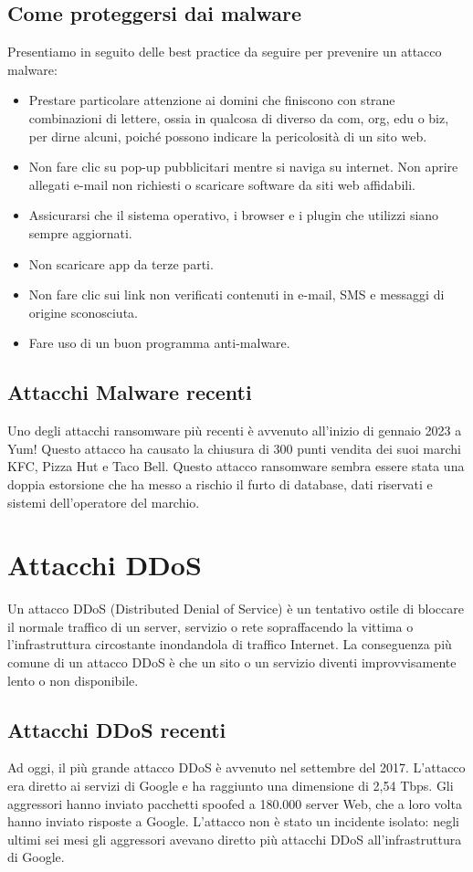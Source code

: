 \subsection{Come proteggersi dai malware}
Presentiamo in seguito delle best practice da seguire per prevenire un attacco malware:
\begin{itemize}
    \item Prestare particolare attenzione ai domini che finiscono con strane combinazioni di lettere, ossia in qualcosa di diverso da com, org, edu o biz, per dirne alcuni, poiché possono indicare la pericolosità di un sito web.
    \item Non fare clic su pop-up pubblicitari mentre si naviga su internet. Non aprire allegati e-mail non richiesti o scaricare software da siti web affidabili.
    \item Assicurarsi che il sistema operativo, i browser e i plugin che utilizzi siano sempre aggiornati.
    \item Non scaricare app da terze parti.
    \item Non fare clic sui link non verificati contenuti in e-mail, SMS e messaggi di origine sconosciuta.
    \item Fare uso di un buon programma anti-malware. 
\end{itemize}
\subsection{Attacchi Malware recenti}
Uno degli attacchi ransomware più recenti è avvenuto all'inizio di gennaio  2023 a Yum! Questo attacco ha causato la chiusura di 300 punti vendita dei suoi marchi KFC, Pizza Hut e Taco Bell.  
Questo attacco ransomware sembra essere stata una doppia estorsione che ha messo a rischio il furto di database, dati riservati e sistemi dell'operatore del marchio.
\cite{Malware}
\section{Attacchi DDoS}
Un attacco DDoS (Distributed Denial of Service) è un tentativo ostile di bloccare il normale traffico di un server, servizio o rete sopraffacendo la vittima o l’infrastruttura circostante inondandola di traffico Internet.
La conseguenza più comune di un attacco DDoS è che un sito o un servizio diventi improvvisamente lento o non disponibile. 
\cite{attaccoDDOS}
\subsection{Attacchi DDoS recenti}
Ad oggi, il più grande attacco DDoS è avvenuto nel settembre del 2017. L'attacco era diretto ai servizi di Google e ha raggiunto una dimensione di 2,54 Tbps. Gli aggressori hanno inviato pacchetti spoofed a 180.000 server Web, che a loro volta hanno inviato risposte a Google. L'attacco non è stato un incidente isolato: negli ultimi sei mesi gli aggressori avevano diretto più attacchi DDoS all'infrastruttura di Google.

